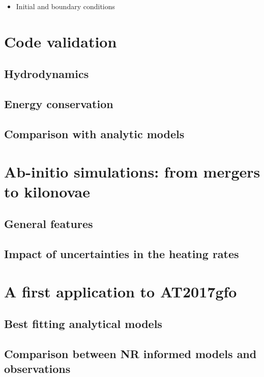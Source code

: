 \documentclass[fleqn,usenatbib]{mnras}
\begin{document}
\begin{itemize}
    
    \item Initial and boundary conditions
\end{itemize}

\section{Code validation}
\subsection{Hydrodynamics}
\subsection{Energy conservation}
\subsection{Comparison with analytic models}

\section{Ab-initio simulations: from mergers to kilonovae}
\subsection{General features}
\subsection{Impact of uncertainties in the heating rates}

\section{A first application to AT2017gfo}
\subsection{Best fitting analytical models}
\subsection{Comparison between NR informed models and observations}
\end{document}
